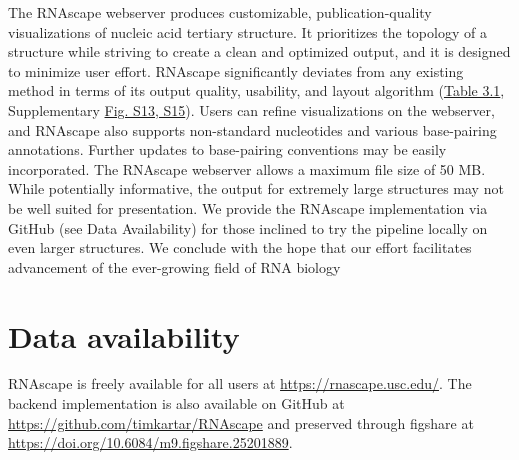 The RNAscape webserver produces customizable, publication-quality visualizations of nucleic acid tertiary structure. It prioritizes the topology of a structure while striving to create a clean and optimized output, and it is designed to minimize user effort. RNAscape significantly deviates from any existing method in terms of its output quality, usability, and layout algorithm (\hyperref[table:rnascape]{Table 3.1}, Supplementary \hyperref[fig:rnascapeS3]{Fig. S13, S15}). Users can refine visualizations on the webserver, and RNAscape also supports non-standard nucleotides and various base-pairing annotations. Further updates to base-pairing conventions may be easily incorporated. The RNAscape webserver allows a maximum file size of 50 MB. While potentially informative, the output for extremely large structures may not be well suited for presentation. We provide the RNAscape implementation via GitHub (see Data Availability) for those inclined to try the pipeline locally on even larger structures. We conclude with the hope that our effort facilitates advancement of the ever-growing field of RNA biology

\section{Data availability}

RNAscape is freely available for all users at \url{https://rnascape.usc.edu/}. The backend implementation is also available on GitHub at \url{https://github.com/timkartar/RNAscape} and preserved through figshare at \url{https://doi.org/10.6084/m9.figshare.25201889}.